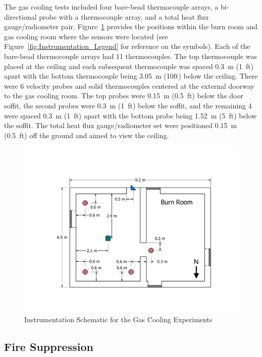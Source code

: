 \documentclass[12pt,oneside]{book}
\begin{document}
The gas cooling tests included four bare-bead thermocouple arrays, a bi-directional probe with a thermocouple array, and a total heat flux gauge/radiometer pair. Figure~\ref{fig:Gas_Cooling_Instrumentation_Dimensions} provides the positions within the burn room and gas cooling room where the sensors were located (see Figure~\ref{fig:Instrumentation_Legend} for reference on the symbols). Each of the bare-bead thermocouple arrays had 11 thermocouples. The top thermocouple was placed at the ceiling and each subsequent thermocouple was spaced 0.3~m (1~ft) apart with the bottom thermocouple being 3.05~m (10ft) below the ceiling. There were 6 velocity probes and solid thermocouples centered at the external doorway to the gas cooling room. The top probes were 0.15~m (0.5~ft) below the door soffit, the second probes were 0.3~m (1~ft) below the soffit, and the remaining 4 were spaced 0.3~m (1~ft) apart with the bottom probe being 1.52~m (5~ft) below the soffit. The total heat flux gauge/radiometer set were positioned 0.15~m (0.5~ft) off the ground and aimed to view the ceiling.

\begin{figure}[!ht]
	\includegraphics[width=\columnwidth]{../Figures/Floor_Plans/PDFs/West_Structure/DelCo_2012_West_Structure_Instrumentation}
	\caption{Instrumentation Schematic for the Gas Cooling Experiments}
	\label{fig:Gas_Cooling_Instrumentation_Dimensions}
\end{figure}

\clearpage

\subsection{Fire Suppression}
\label{subsec:Fire_Suppression_Instrumentation}
\end{document}
